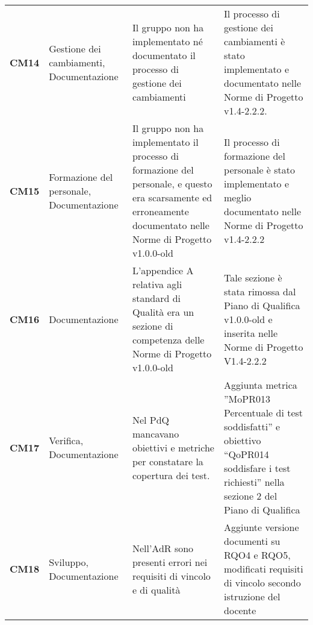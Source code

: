 \documentclass[../piano-di-qualifica.tex]{subfiles}
\begin{document}
\begin{longtable}[H]{>{\centering\bfseries}m{2.5cm} >{\centering}m{2.5cm} >{\centering}m{5.5cm} >{\centering\arraybackslash}m{5.5cm}}
CM14 & Gestione dei cambiamenti, Documentazione      & Il gruppo non ha implementato né documentato il processo di gestione dei cambiamenti                                                                                          & Il processo di gestione dei cambiamenti è stato implementato e documentato nelle Norme di Progetto v1.4-2.2.2.                                                                                                                                                                                                                                      \\
CM15 & Formazione del personale, Documentazione      & Il gruppo non ha implementato il processo di formazione del personale, e questo era scarsamente ed erroneamente documentato nelle Norme di Progetto v1.0.0-old                & Il processo di formazione del personale è stato implementato e meglio documentato nelle Norme di Progetto v1.4-2.2.2                                                                                                                                                                                                                                \\
CM16 & Documentazione                                & L’appendice A relativa agli standard di Qualità era un sezione di competenza delle Norme di Progetto v1.0.0-old                                                               & Tale sezione è stata rimossa dal Piano di Qualifica v1.0.0-old e inserita nelle Norme di Progetto V1.4-2.2.2                                                                                                                                                                                                                                        \\
CM17 & Verifica, Documentazione                      & Nel PdQ mancavano obiettivi e metriche per constatare la copertura dei test.                                                                                                  & Aggiunta metrica ”MoPR013 Percentuale di test soddisfatti” e obiettivo “QoPR014  soddisfare i test richiesti” nella sezione 2 del Piano di Qualifica                                                                                                                                                                                                \\
CM18 & Sviluppo, Documentazione                      & Nell’AdR sono presenti errori nei requisiti di vincolo e di qualità                                                                                                           & Aggiunte versione documenti su RQO4 e RQO5, modificati requisiti di vincolo secondo istruzione del docente                                                                                                                                                                                                                                          \\

\end{longtable}
\end{document}
